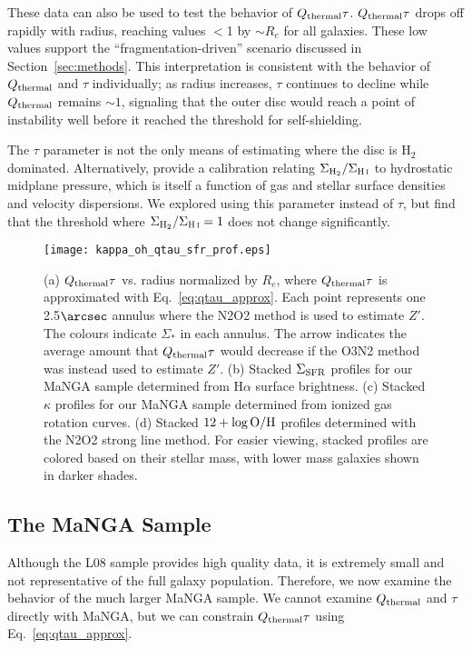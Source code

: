 \documentclass[fleqn,usenatbib]{mnras}
\newcommand{\qh}{Q_{\rm thermal}}
\begin{document}
These data can also be used to test the behavior of $\qh\tau$.  $\qh\tau$ drops off rapidly with radius, reaching values $<$1 by ${\sim}R_e$ for all galaxies. These low values support the ``fragmentation-driven'' scenario discussed in Section~\ref{sec:methods}.  This interpretation is consistent with the behavior of $\qh$ and $\tau$ individually; as radius increases, $\tau$ continues to decline while $\qh$ remains $\sim1$, signaling that the outer disc would reach a point of instability well before it reached the threshold for self-shielding.

The $\tau$ parameter is not the only means of estimating where the disc is H$_2$ dominated.  Alternatively, \citet{Blitz06} provide a calibration relating $\Sigma_{\rm H_2}/\Sigma_{\rm \textsc{H\,i}}$ to hydrostatic midplane pressure, which is itself a function of gas and stellar surface densities and velocity dispersions.  We explored using this parameter instead of $\tau$, but find that the threshold where $\Sigma_{\rm H_2}/\Sigma_{\rm \textsc{H\,i}}=1$ does not change significantly.

\begin{figure*}
\texttt{[image: kappa\_oh\_qtau\_sfr\_prof.eps]}
\caption{(a) $\qh\tau$ vs. radius normalized by $R_e$, where $\qh\tau$ is approximated with Eq.~\ref{eq:qtau_approx}.  Each point represents one 2.5$\arcsec$ annulus where the N2O2 method is used to estimate $Z'$. The colours indicate $\Sigma_*$ in each annulus.  The arrow indicates the average amount that $\qh\tau$ would decrease if the O3N2 method was instead used to estimate $Z'$.  (b) Stacked $\Sigma_{\rm SFR}$ profiles for our MaNGA sample determined from H$\alpha$ surface brightness. (c) Stacked $\kappa$ profiles for our MaNGA sample determined from ionized gas rotation curves.  (d) Stacked $12+\log{\rm O/H}$ profiles determined with the N2O2 strong line method. For easier viewing, stacked profiles are colored based on their stellar mass, with lower mass galaxies shown in darker shades.}
\label{fig:tau_q_data}
\end{figure*} 

\subsection{The MaNGA Sample}

Although the L08 sample provides high quality data, it is extremely small and not representative of the full galaxy population. Therefore, we now examine the behavior of the much larger MaNGA sample. We cannot examine $\qh$ and $\tau$ directly with MaNGA, but we can constrain $\qh\tau$ using Eq.~\ref{eq:qtau_approx}. 
\end{document}
